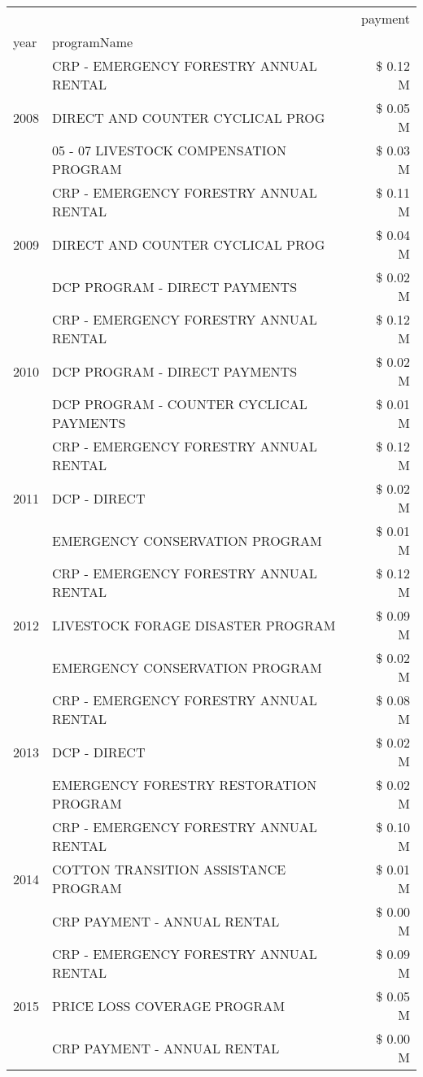 \begin{tabular}{llr}
\toprule
 &  & payment \\
year & programName &  \\
\midrule
\multirow[t]{3}{*}{2008} & CRP - EMERGENCY FORESTRY ANNUAL RENTAL & \$ 0.12 M \\
 & DIRECT AND COUNTER CYCLICAL PROG & \$ 0.05 M \\
 & 05 - 07 LIVESTOCK COMPENSATION PROGRAM & \$ 0.03 M \\
\cline{1-3}
\multirow[t]{3}{*}{2009} & CRP - EMERGENCY FORESTRY ANNUAL RENTAL & \$ 0.11 M \\
 & DIRECT AND COUNTER CYCLICAL PROG & \$ 0.04 M \\
 & DCP PROGRAM - DIRECT PAYMENTS & \$ 0.02 M \\
\cline{1-3}
\multirow[t]{3}{*}{2010} & CRP - EMERGENCY FORESTRY ANNUAL RENTAL & \$ 0.12 M \\
 & DCP PROGRAM - DIRECT PAYMENTS & \$ 0.02 M \\
 & DCP PROGRAM - COUNTER CYCLICAL PAYMENTS & \$ 0.01 M \\
\cline{1-3}
\multirow[t]{3}{*}{2011} & CRP - EMERGENCY FORESTRY ANNUAL RENTAL & \$ 0.12 M \\
 & DCP - DIRECT & \$ 0.02 M \\
 & EMERGENCY CONSERVATION PROGRAM & \$ 0.01 M \\
\cline{1-3}
\multirow[t]{3}{*}{2012} & CRP - EMERGENCY FORESTRY ANNUAL RENTAL & \$ 0.12 M \\
 & LIVESTOCK FORAGE DISASTER PROGRAM & \$ 0.09 M \\
 & EMERGENCY CONSERVATION PROGRAM & \$ 0.02 M \\
\cline{1-3}
\multirow[t]{3}{*}{2013} & CRP - EMERGENCY FORESTRY ANNUAL RENTAL & \$ 0.08 M \\
 & DCP - DIRECT & \$ 0.02 M \\
 & EMERGENCY FORESTRY RESTORATION PROGRAM & \$ 0.02 M \\
\cline{1-3}
\multirow[t]{3}{*}{2014} & CRP - EMERGENCY FORESTRY ANNUAL RENTAL & \$ 0.10 M \\
 & COTTON TRANSITION ASSISTANCE PROGRAM & \$ 0.01 M \\
 & CRP PAYMENT - ANNUAL RENTAL & \$ 0.00 M \\
\cline{1-3}
\multirow[t]{3}{*}{2015} & CRP - EMERGENCY FORESTRY ANNUAL RENTAL & \$ 0.09 M \\
 & PRICE LOSS COVERAGE PROGRAM & \$ 0.05 M \\
 & CRP PAYMENT - ANNUAL RENTAL & \$ 0.00 M \\

\end{tabular}

